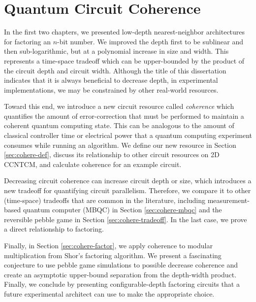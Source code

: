 \chapter{Quantum Circuit Coherence}
\label{chap:coherence}

In the first two chapters, we presented low-depth nearest-neighbor
architectures for factoring an $n$-bit number. We improved the depth first to
be sublinear and then sub-logarithmic, but at a polynomial increase in size
and width. This represents a time-space tradeoff which can be upper-bounded
by the product of the circuit depth and circuit width. Although the title of
this dissertation indicates that it is always beneficial to decrease depth, in
experimental implementations, we may be constrained by other real-world
resources.

Toward this end, we introduce a new circuit resource called \emph{coherence}
which quantifies the amount of error-correction that must be performed
to maintain a coherent quantum computing state. This can be analogous to
the amount of classical controller time or electrical power that a
quantum computing experiment consumes while running an algorithm. We
define our new resource in Section \ref{sec:cohere-def}, discuss its
relationship to other circuit resources on \textsf{2D CCNTCM}, and
calculate coherence for an example circuit.

Decreasing circuit coherence can increase circuit depth or size, which introduces
a new tradeoff for quantifying circuit parallelism.
Therefore, we compare it to other (time-space) tradeoffs that are common in
the literature, including measurement-based quantum computer (MBQC) in
Section \ref{sec:cohere-mbqc} and the reversible pebble game in
Section \ref{sec:cohere-tradeoff}. In the last case, we prove a
direct relationship to factoring.

Finally, in Section \ref{sec:cohere-factor}, we apply coherence to modular
multiplication from Shor's factoring algorithm.
We present a fascinating conjecture to use pebble game simulations to
possible decrease coherence and create an asymptotic upper-bound
separation from the depth-width product.
Finally, we conclude
by presenting configurable-depth factoring circuits
that a future experimental architect can use to make the appropriate choice.










%

%